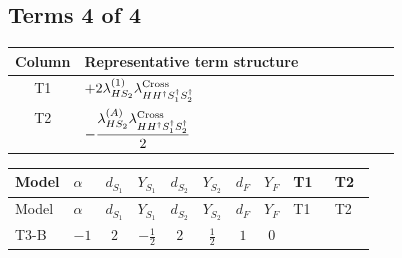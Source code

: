 \documentclass[8pt]{article}
\begin{document}
\begin{landscape}
\subsection*{Terms 4 of 4}
\begin{center}
\begin{tabular}{@{}c >{\raggedright\arraybackslash}p{0.82\linewidth}@{}}
\toprule
Column & Representative term structure \\
\midrule
T1 & \(\displaystyle +2 {\lambda_{HS_2}^{(1)}} {\lambda_{H H^\dagger S_1^\dagger S_2^\dagger}^{\rm Cross}}\) \\
\midrule
T2 & \(\displaystyle -\frac{{\lambda_{HS_2}^{(A)}} {\lambda_{H H^\dagger S_1^\dagger S_2^\dagger}^{\rm Cross}}}{2}\) \\
\midrule
\bottomrule
\end{tabular}
\end{center}
\smallskip
\tiny
\begin{longtable}{@{}llcccccc >{\raggedright\arraybackslash}p{0.21\linewidth} >{\raggedright\arraybackslash}p{0.21\linewidth}@{}}
\toprule
Model & $\alpha$ & $d_{S_1}$ & $Y_{S_1}$ & $d_{S_2}$ & $Y_{S_2}$ & $d_F$ & $Y_F$ & T1 & T2 \\
\midrule
\endfirsthead
\toprule
Model & $\alpha$ & $d_{S_1}$ & $Y_{S_1}$ & $d_{S_2}$ & $Y_{S_2}$ & $d_F$ & $Y_F$ & T1 & T2 \\
\midrule
\endhead
T3-B & $-1$ & $2$ & $-\frac{1}{2}$ & $2$ & $\frac{1}{2}$ & $1$ & $0$ & \scriptsize\adjustbox{max width=\linewidth}{$\begin{gathered} +2 {\lambda_{HS_2}^{(1)}} {\lambda_{H H^\dagger S_1^\dagger S_2^\dagger}^{\rm Cross}}\end{gathered}$} & \scriptsize\adjustbox{max width=\linewidth}{$\begin{gathered} -\frac{{\lambda_{HS_2}^{(A)}} {\lambda_{H H^\dagger S_1^\dagger S_2^\dagger}^{\rm Cross}}}{2}\end{gathered}$} \\
\midrule
\bottomrule
\end{longtable}
\end{landscape}
\end{document}
